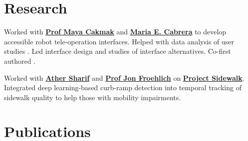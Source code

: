 \documentclass[]{deedy-resume-openfont}
\begin{document}
\begin{paracol}{2}

\section{Research}
Worked with \textbf{\href{https://homes.cs.washington.edu/~mcakmak/}{Prof Maya Cakmak}} and \textbf{\href{https://marucabrera.wixsite.com/homepage}{Maria E. Cabrera}} to develop accessible robot tele-operation interfaces. Helped with data analysis of user studies \cite{CabreraBDC21}. Led interface design and studies of interface alternatives. Co-first authored  \cite{CabreraDKBC21}.
\sectionsep

Worked with \textbf{\href{https://athersharif.me}{Ather Sharif}} and \textbf{\href{https://makeabilitylab.cs.washington.edu/member/jonfroehlich/}{Prof Jon Froehlich}} on \textbf{\href{https://makeabilitylab.cs.washington.edu/project/sidewalk/}{Project Sidewalk}}. Integrated deep learning-based curb-ramp detection into temporal tracking of sidewalk quality to help those with mobility impairments. \cite{SharifGSBFWDF21}
\sectionsep


\section{Publications} 
\nocite{*}
\printbibliography[heading=none]

\end{paracol}
\renewcommand{\thefootnote}{\fnsymbol{footnote}}
\end{document}
